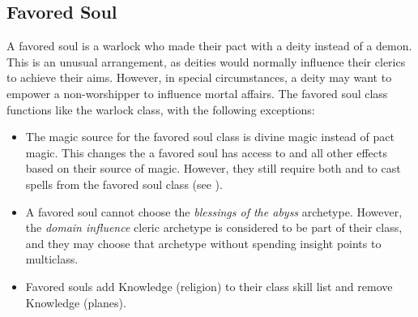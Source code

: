     \subsection{Favored Soul}
        A favored soul is a warlock who made their pact with a deity instead of a demon.
        This is an unusual arrangement, as deities would normally influence their clerics to achieve their aims.
        However, in special circumstances, a deity may want to empower a non-worshipper to influence mortal affairs.
        The favored soul class functions like the warlock class, with the following exceptions:
        \begin{itemize}
            \item The magic source for the favored soul class is divine magic instead of pact magic.
                This changes the  a favored soul has access to and all other effects based on their source of magic.
                However, they still require both  and  to cast spells from the favored soul class (see ).
            \item A favored soul cannot choose the \textit{blessings of the abyss} archetype. However, the \textit{domain influence} cleric archetype is considered to be part of their class, and they may choose that archetype without spending insight points to multiclass.
            \item Favored souls add Knowledge (religion) to their class skill list and remove Knowledge (planes).
        \end{itemize}

